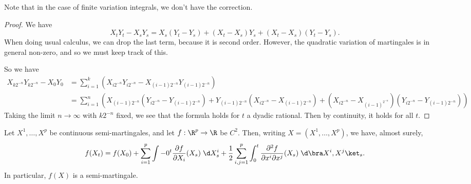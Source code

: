 \documentclass[a4paper]{article}
\begin{document}
Note that in the case of finite variation integrals, we don't have the correction.
\begin{proof}
  We have
  \[
    X_t Y_t - X_s Y_s = X_s (Y_t - Y_s) + (X_t - X_s) Y_s + (X_t - X_s)(Y_t - Y_s).
  \]
  When doing usual calculus, we can drop the last term, because it is second order. However, the quadratic variation of martingales is in general non-zero, and so we must keep track of this.

  So we have
  \begin{align*}
    X_{k2^{-n}} Y_{k2^{-n}} - X_0 Y_0 &= \sum_{i = 1}^k (X_{i2^{-n}} Y_{i2^{-n}} - X_{(i - 1)2^{-n}}Y_{(i - 1)2^{-n}})\\
    &= \sum_{i = 1}^n \left( X_{(i - 1)2^{-n}} (Y_{i2^{-n}} - Y_{(i - 1)2^{-n}}) + Y_{(i - 1)2^{-n}}(X_{i 2^{-n}} - X_{(i - 1)2^{-n}}) + (X_{i2^{-n}} - X_{(i - 1)^{2^{-n}}})(Y_{i2^{-n}} - Y_{(i - 1)2^{-n}})\right)
  \end{align*}
  Taking the limit $n \to \infty$ with $k2^{-n}$ fixed, we see that the formula holds for $t$ a dyadic rational. Then by continuity, it holds for all $t$.
\end{proof}

\begin{thm}[It\^o's formula]
  Let $X^1, \ldots, X^p$ be continuous semi-martingales, and let $f: \R^p \to \R$ be $C^2$. Then, writing $X = (X^1, \ldots, X^p)$, we have, almost surely,
  \[
    f(X_t) = f(X_0) + \sum_{i = 1}^p \int-0^t \frac{\partial f}{\partial X_i}(X_s)\;\d X_s^i + \frac{1}{2} \sum_{i, j = 1}^p \int_0^t \frac{\partial^2 f}{\partial x^i \partial x^j} (X_s) \;\d \bra X^i, X^j\ket_s.
  \]
  In particular, $f(X)$ is a semi-martingale.
\end{thm}
\end{document}
